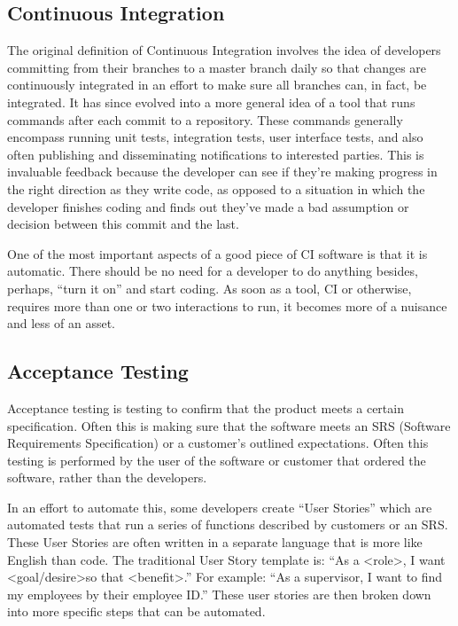 \documentclass[12pt]{ucthesis}
\begin{document}
\subsection{Continuous Integration}
The original definition of Continuous Integration involves the idea of developers committing from their  branches to a master branch daily so that changes are continuously integrated in an effort to make sure all branches can, in fact, be integrated. It has since evolved into a more general idea of a tool that runs commands after each commit to a repository. These commands generally encompass running unit tests, integration tests, user interface tests, and also often publishing and disseminating notifications to interested parties. This is invaluable feedback because the developer can see if they're making progress in the right direction as they write code, as opposed to a situation in which the developer finishes coding and finds out they've made a bad assumption or decision between this commit and the last. 

One of the most important aspects of a good piece of CI software is that it is automatic. There should be no need for a developer to do anything besides, perhaps, ``turn it on'' and start coding. As soon as a tool, CI or otherwise, requires more than one or two interactions to run, it becomes more of a nuisance and less of an asset.

\subsection{Acceptance Testing}
Acceptance testing is testing to confirm that the product meets a certain specification. Often this is making sure that the software meets an SRS (Software Requirements Specification) or a customer's outlined expectations. Often this testing is performed by the user of the software or customer that ordered the software, rather than the developers.

In an effort to automate this, some developers create ``User Stories'' which are automated tests that run a series of functions described by customers or an SRS. These User Stories are often written in a separate language that is more like English than code. The traditional User Story template is: ``As a \textless role\textgreater, I want \textless goal/desire\textgreater \space so that \textless benefit\textgreater.'' For example: ``As a supervisor, I want to find my employees by their employee ID.'' These user stories are then broken down into more specific steps that can be automated.
\end{document}
